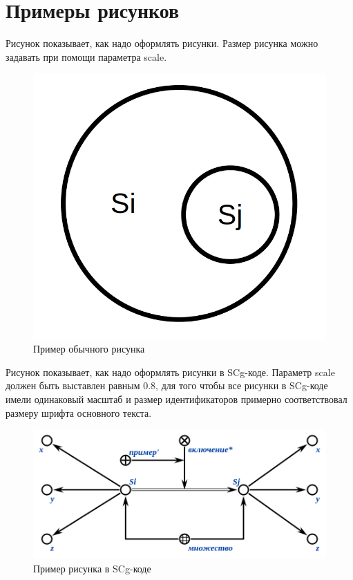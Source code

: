 
\section*{Примеры рисунков}

Рисунок \textit{} показывает, как надо оформлять рисунки. Размер рисунка можно задавать при помощи параметра scale.

\begin{figure}[H]
	\includegraphics[scale=0.5]{images/fig_example.png}
	\caption{Пример обычного рисунка}
	\label{fig:example}
\end{figure}

Рисунок \textit{} показывает, как надо оформлять рисунки в SCg-коде. Параметр scale должен быть выставлен равным 0.8, для того чтобы все рисунки в SCg-коде имели одинаковый масштаб и размер идентификаторов примерно соответствовал размеру шрифта основного текста.  

\begin{figure}[H]
	\includegraphics[scale=0.8]{images/fig_example_scg.png}
	\caption{Пример рисунка в SCg-коде}
	\label{fig:example_scg}
\end{figure}

